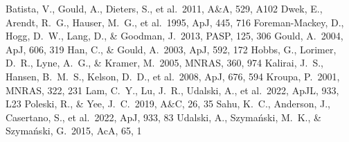 \documentclass{aastex701}
\begin{document}

\begin{thebibliography}{}
 Batista, V., Gould, A., Dieters, S., et al.\ 2011, A\&A, 529, A102
 Dwek, E., Arendt, R.~G., Hauser, M.~G., et al.\ 1995, ApJ, 445, 716
 Foreman-Mackey, D., Hogg, D.~W., Lang, D., \& Goodman, J.\ 2013, PASP, 125, 306
 Gould, A.\ 2004, ApJ, 606, 319
 Han, C., \& Gould, A.\ 2003, ApJ, 592, 172
 Hobbs, G., Lorimer, D.~R., Lyne, A.~G., \& Kramer, M.\ 2005, MNRAS, 360, 974
 Kalirai, J.~S., Hansen, B.~M.~S., Kelson, D.~D., et al.\ 2008, ApJ, 676, 594
 Kroupa, P.\ 2001, MNRAS, 322, 231
 Lam, C.~Y., Lu, J.~R., Udalski, A., et al.\ 2022, ApJL, 933, L23
 Poleski, R., \& Yee, J.~C.\ 2019, A\&C, 26, 35
 Sahu, K.~C., Anderson, J., Casertano, S., et al.\ 2022, ApJ, 933, 83
 Udalski, A., Szyma{\'n}ski, M.~K., \& Szyma{\'n}ski, G.\ 2015, AcA, 65, 1
\end{thebibliography}
\end{document}
